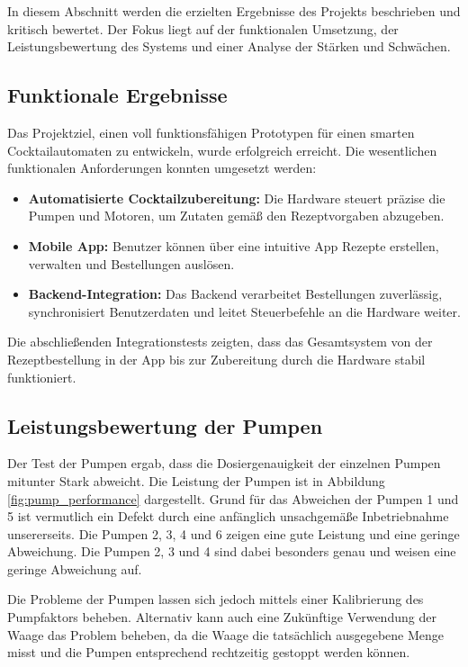 In diesem Abschnitt werden die erzielten Ergebnisse des Projekts beschrieben und kritisch bewertet. 
Der Fokus liegt auf der funktionalen Umsetzung, der Leistungsbewertung des Systems und einer Analyse 
der Stärken und Schwächen.

\subsection{Funktionale Ergebnisse}

Das Projektziel, einen voll funktionsfähigen Prototypen für einen smarten Cocktailautomaten zu 
entwickeln, wurde erfolgreich erreicht. Die wesentlichen funktionalen Anforderungen konnten 
umgesetzt werden:

\begin{itemize}
  \item \textbf{Automatisierte Cocktailzubereitung:} Die Hardware steuert präzise die Pumpen und 
  Motoren, um Zutaten gemäß den Rezeptvorgaben abzugeben.
  \item \textbf{Mobile App:} Benutzer können über eine intuitive App Rezepte erstellen, verwalten 
  und Bestellungen auslösen.
  \item \textbf{Backend-Integration:} Das Backend verarbeitet Bestellungen zuverlässig, 
  \\synchronisiert Benutzerdaten und leitet Steuerbefehle an die Hardware weiter.
\end{itemize}
Die abschließenden Integrationstests zeigten, dass das Gesamtsystem von der Rezeptbestellung in der 
App bis zur Zubereitung durch die Hardware stabil funktioniert.

\subsection{Leistungsbewertung der Pumpen}

Der Test der Pumpen ergab, dass die Dosiergenauigkeit der einzelnen Pumpen mitunter Stark abweicht. 
Die Leistung der Pumpen ist in Abbildung \ref{fig:pump_performance} dargestellt. Grund für das 
Abweichen der Pumpen 1 und 5 ist vermutlich ein Defekt durch eine anfänglich unsachgemäße 
Inbetriebnahme unsererseits. Die Pumpen 2, 3, 4 und 6 zeigen eine gute Leistung und eine geringe 
Abweichung. Die Pumpen 2, 3 und 4 sind dabei besonders genau und weisen eine geringe Abweichung auf.

Die Probleme der Pumpen lassen sich jedoch mittels einer Kalibrierung des Pumpfaktors beheben. 
Alternativ kann auch eine Zukünftige Verwendung der Waage das Problem beheben, da die Waage die
tatsächlich ausgegebene Menge misst und die Pumpen entsprechend rechtzeitig gestoppt werden können.

